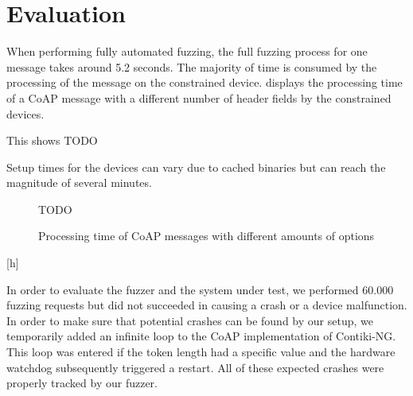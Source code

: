 \section{Evaluation}
\label{section:evaluation}


When performing fully automated fuzzing, the full fuzzing process for one message takes around 5.2 seconds. The majority of time is consumed by the processing of the message on the constrained device.  displays the processing time of a CoAP message with a different number of header fields by the constrained devices.

This shows TODO

Setup times for the devices can vary due to cached binaries but can reach the magnitude of several minutes.

\begin{figure}[h]
	\centering
	TODO
	\caption{Processing time of CoAP messages with different amounts of options}
	\label{figure:fuzzing_performance}
\end{figure}[h]

In order to evaluate the fuzzer and the system under test, we performed 60.000 fuzzing requests but did not succeeded in causing a crash or a device malfunction. In order to make sure that potential crashes can be found by our setup, we temporarily added an infinite loop to the CoAP implementation of Contiki-NG. This loop was entered if the token length had a specific value and the hardware watchdog subsequently triggered a restart. All of these expected crashes were properly tracked by our fuzzer.